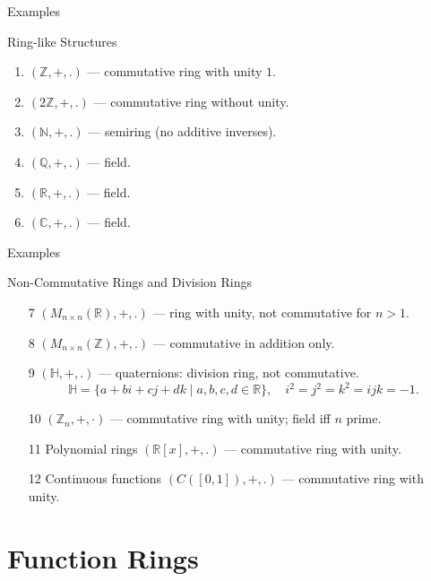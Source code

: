 \documentclass[11pt,aspectratio=43,ignorenonframetext,t]{beamer}
\begin{document}
\begin{frame}{Examples}
\begin{block}{Ring-like Structures}
  \begin{enumerate}
      \item $(\mathbb{Z},+,.)$ — commutative ring with unity $1$.
      \item $(2\mathbb{Z},+,.)$ — commutative ring without unity.
\item $(\mathbb{N},+,.)$ — semiring (no additive inverses).
\item $(\mathbb{Q},+,.)$ — field.
\item $(\mathbb{R},+,.)$ — field.
\item $(\mathbb{C},+,.)$ — field.
  \end{enumerate}  
\end{block}

\end{frame}

\begin{frame}{Examples}
\begin{block}{Non-Commutative Rings and Division Rings}
\begin{enumerate}
\item[7] $(M_{n\times n}(\mathbb{R}), +, .)$ — ring with unity, not commutative for $n>1$.  
\item[8] $(M_{n\times n}(\mathbb{Z}), +, .)$ — commutative in addition only.  
\item[9] $(\mathbb{H},+,.)$ — quaternions: division ring, not commutative.  
\[
\mathbb{H}=\{a+bi+cj+dk \mid a,b,c,d\in\mathbb{R}\},\quad i^2=j^2=k^2=ijk=-1.
\]
\item[10] $(\mathbb{Z}_n, +, \cdot)$ — commutative ring with unity; field iff $n$ prime.  
\item[11]  Polynomial rings $(\mathbb{R}[x], +, .)$ — commutative ring with unity.  
\item[12]  Continuous functions $(C([0,1]), +, .)$ — commutative ring with unity.
\end{enumerate} 
\end{block}
 
\end{frame}

\section{Function Rings}
\end{document}
